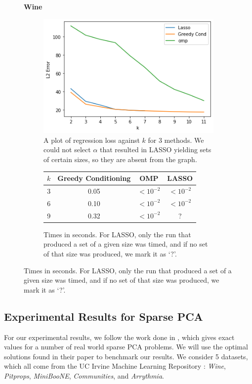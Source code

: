 \documentclass{amsart}
\theoremstyle{definition}
\begin{document}
\begin{figure}[H]
    \centering
    \textbf{Wine}\par\medskip
    \begin{subfigure}[b]{0.4\textwidth}
        \includegraphics[width=\textwidth]{wine.png}
        \caption{A plot of regression loss against $k$ for 3 methods. We could not select $\alpha$ that resulted in LASSO yielding sets of certain sizes, so they are absent from the graph.}
    \end{subfigure}
    \begin{subfigure}[b]{0.4\textwidth}
        \begin{tabular}{c c c c}
            $k$ & Greedy Conditioning & OMP & LASSO \\
            \hline
            3 & 0.05 & $<10^{-2}$ & $<10^{-2}$\\
            6 & 0.10& $<10^{-2}$ & $<10^{-2}$\\
            9 & 0.32 & $<10^{-2}$ & ?\\
        \end{tabular}
        \vspace{0.5in}
        \caption{Times in seconds. For LASSO, only the run that produced a set of a given size was timed, and if no set of that size was produced, we mark it as `?'.}
    \end{subfigure}
\end{figure}

\subsection{Experimental Results for Sparse PCA}
\label{subsec:expPCA}
For our experimental results, we follow the work done in \cite{bertsimas2022solving}, which gives exact values for a number of real world sparse PCA problems.
We will use the optimal solutions found in their paper to benchmark our results.
We consider 5 datasets, which all come from the UC Irvine Machine Learning Repository \cite{Dua:2019}: \emph{Wine}, \emph{Pitprops}, \emph{MiniBooNE}, \emph{Communities}, and \emph{Arrythmia}.
\end{document}
